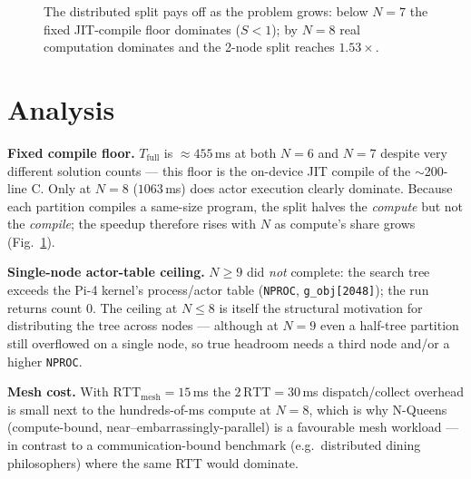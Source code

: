 \documentclass[11pt]{article}
\begin{document}
\begin{figure}[h]\centering
{}
\caption{The distributed split pays off as the problem grows: below $N{=}7$ the
fixed JIT-compile floor dominates ($S<1$); by $N{=}8$ real computation dominates
and the 2-node split reaches $1.53\times$.}
\label{fig:speedup}
\end{figure}

\section{Analysis}
\textbf{Fixed compile floor.} $T_\mathrm{full}$ is $\approx 455$\,ms at both
$N{=}6$ and $N{=}7$ despite very different solution counts --- this floor is the
on-device JIT compile of the $\sim$200-line C. Only at $N{=}8$ ($1063$\,ms) does
actor execution clearly dominate. Because each partition compiles a same-size
program, the split halves the \emph{compute} but not the \emph{compile}; the
speedup therefore rises with $N$ as compute's share grows (Fig.~\ref{fig:speedup}).

\noindent\textbf{Single-node actor-table ceiling.} $N{\ge}9$ did \emph{not}
complete: the search tree exceeds the Pi-4 kernel's process/actor table
(\texttt{NPROC}, \texttt{g\_obj[2048]}); the run returns count $0$. The
ceiling at $N{\le}8$ is itself the structural motivation for distributing the
tree across nodes --- although at $N{=}9$ even a half-tree partition still
overflowed on a single node, so true headroom needs a third node and/or a higher
\texttt{NPROC}.

\noindent\textbf{Mesh cost.} With $\mathrm{RTT_{mesh}}=15$\,ms the
$2\,\mathrm{RTT}=30$\,ms dispatch/collect overhead is small next to the
hundreds-of-ms compute at $N{=}8$, which is why N-Queens (compute-bound,
near--embarrassingly-parallel) is a favourable mesh workload --- in contrast to a
communication-bound benchmark (e.g.\ distributed dining philosophers) where the
same RTT would dominate.
\end{document}
